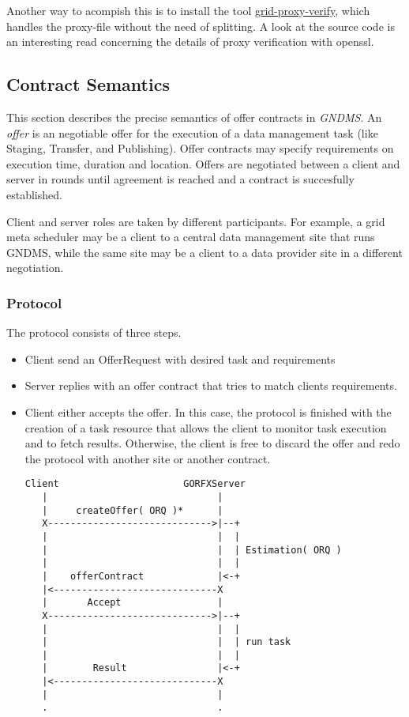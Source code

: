 \documentclass{article}
\begin{document}
Another way to acompish this is to install the tool
\href{http://www.nikhef.nl/~janjust/proxy-verify/}{grid-proxy-verify},
which handles the proxy-file without the need of splitting. A look
at the source code is an interesting read concerning the details of
proxy verification with openssl.

\subsection{Contract Semantics}

This section describes the precise semantics of offer contracts in
\emph{GNDMS}. An \emph{offer} is an negotiable offer for the
execution of a data management task (like Staging, Transfer, and
Publishing). Offer contracts may specify requirements on execution
time, duration and location. Offers are negotiated between a client
and server in rounds until agreement is reached and a contract is
succesfully established.

Client and server roles are taken by different participants. For
example, a grid meta scheduler may be a client to a central data
management site that runs GNDMS, while the same site may be a
client to a data provider site in a different negotiation.

\subsubsection{Protocol}

The protocol consists of three steps.

\begin{itemize}
\item
  Client send an OfferRequest with desired task and requirements
\item
  Server replies with an offer contract that tries to match clients
  requirements.
\item
  Client either accepts the offer. In this case, the protocol is
  finished with the creation of a task resource that allows the
  client to monitor task execution and to fetch results. Otherwise,
  the client is free to discard the offer and redo the protocol with
  another site or another contract.

\begin{verbatim}
Client                      GORFXServer 
   |                              |
   |     createOffer( ORQ )*      |
   X----------------------------->|--+
   |                              |  |
   |                              |  | Estimation( ORQ )
   |                              |  |
   |    offerContract             |<-+
   |<-----------------------------X
   |       Accept                 |
   X----------------------------->|--+
   |                              |  |
   |                              |  | run task
   |                              |  |
   |        Result                |<-+
   |<-----------------------------X
   |                              |
   .                              .
\end{verbatim}
\end{itemize}
\end{document}
